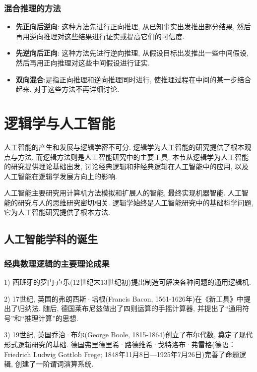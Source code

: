\subsubsection{混合推理的方法}
\begin{itemize}
\item \textbf{先正向后逆向}: 这种方法先进行正向推理, 从已知事实出发推出部分结果, 然后再用逆向推理对这些结果进行证实或提高它们的可信度.
\item \textbf{先逆向后正向}: 这种方法先进行逆向推理, 从假设目标出发推出一些中间假设, 然后再用正向推理对这些中间假设进行证实.
\item \textbf{双向混合}:是指正向推理和逆向推理同时进行, 使推理过程在中间的某一步结合起来. 对于这些方法不再详细讨论.
\end{itemize}
\section{逻辑学与人工智能}

人工智能的产生和发展与逻辑学密不可分. 逻辑学为人工智能的研究提供了根本观点与方法, 而逻辑方法则是人工智能研究中的主要工具. 本节从逻辑学为人工智能的研究提供理论基础出发, 讨论经典逻辑和非经典逻辑在人工智能中的应用, 以及人工智能在逻辑学发展方向上的影响.

人工智能主要研究用计算机方法模拟和扩展人的智能, 最终实现机器智能. 人工智能的研究与人的思维研究密切相关. 逻辑学始终是人工智能研究中的基础科学问题, 它为人工智能研究提供了根本方法.

\subsection{人工智能学科的诞生}
\subsubsection{经典数理逻辑的主要理论成果}
1) 西班牙的罗门$\cdot$卢乐(12世纪末13世纪初)提出制造可解决各种问题的通用逻辑机.

2) 17世纪, 英国的弗朗西斯·培根(Francis Bacon, 1561-1626年)在《新工具》中提出了归纳法. 随后, 德国莱布尼兹做出了四则运算的手摇计算器, 并提出了“通用符号”和“推理计算”的思想.

3) 19世纪, 英国乔治·布尔(George Boole, 1815-1864)创立了布尔代数, 奠定了现代形式逻辑研究的基础. 德国弗里德里希·路德维希·戈特洛布·弗雷格(德语：Friedrich Ludwig Gottlob Frege; 1848年11月8日—1925年7月26日)完善了命题逻辑, 创建了一阶谓词演算系统.

